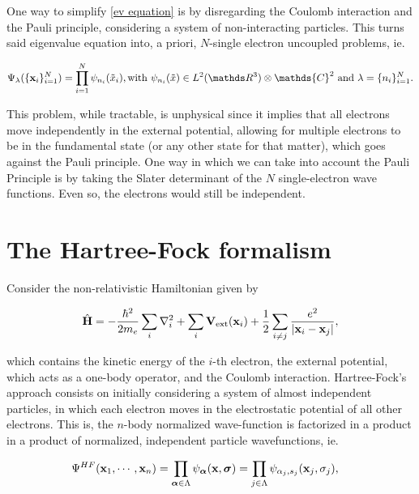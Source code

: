 \documentclass{homework}
\begin{document}
One way to simplify \eqref{ev equation} is by disregarding the Coulomb interaction and the Pauli principle, considering a system of non-interacting particles. This turns said eigenvalue equation into, a priori, $N$-single electron uncoupled problems, ie.

$$
\Psi_\lambda(\{{\bf x}_i\}_{i=1}^{N}) = \prod_{i=1}^{N} \psi_{n_i}(\tilde{x}_i), \textnormal{with } \psi_{n_i}(\tilde{x}) \in L^2(\R^{3}) \otimes \mathds{C}^2 \textnormal{ and } \lambda = \{n_i\}_{i=1}^{N}.
$$

This problem, while tractable, is unphysical since it implies that all electrons move independently in the external potential, allowing for multiple electrons to be in the fundamental state (or any other state for that matter), which goes against the Pauli principle. One way in which we can take into account the Pauli Principle is by taking the Slater determinant of the $N$ single-electron wave functions. Even so, the electrons would still be independent. \\

\section{The Hartree-Fock formalism}

Consider the non-relativistic Hamiltonian given by 

\begin{equation}
    \hat{\bf H} = -\frac{\hbar^2}{2m_e} \sum_i \nabla^2_i + \sum_{i} {\bf V}_{\textnormal{ext}} ({\bf x}_i) + \frac{1}{2} \sum_{i \neq j} \frac{e^2}{|{\bf x}_i-{\bf x}_j|},
\label{hamiltonian HF}
\end{equation}

which contains the kinetic energy of the $i$-th electron, the external potential, which acts as a one-body operator, and the Coulomb interaction. Hartree-Fock's approach consists on initially considering a system of almost independent particles, in which each electron moves in the electrostatic potential of all other electrons. This is, the $n$-body normalized wave-function is factorized in a product in a product of normalized, independent particle wavefunctions, ie.

\begin{align}
     & \Psi^{HF} ({\bf x}_1, \cdots, {\bf x}_n) = \prod_{\bm{\alpha} \in \Lambda} \psi_{\bm{\alpha}}({\bf x}, {\bm \sigma}) =  \prod_{j \in \Lambda}\psi_{\alpha_j, s_j}({\bf x}_j, \sigma_j),
     \label{Hartree's ansatz}
\end{align}
\end{document}
